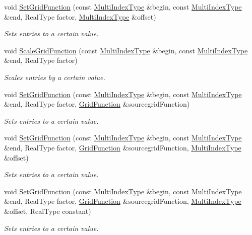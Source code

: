 \begin{DoxyCompactItemize}
void \hyperlink{classGridFunction_adc4e126ab14dd32a55243cb75b1c2083}{Set\-Grid\-Function} (const \hyperlink{classArray}{Multi\-Index\-Type} \&begin, const \hyperlink{classArray}{Multi\-Index\-Type} \&end, Real\-Type factor, \hyperlink{classArray}{Multi\-Index\-Type} \&offset)
\begin{DoxyCompactList}\small\item\em Sets entries to a certain value. \end{DoxyCompactList}\item 
void \hyperlink{classGridFunction_a8970655a48c5af01d053593bdd475068}{Scale\-Grid\-Function} (const \hyperlink{classArray}{Multi\-Index\-Type} \&begin, const \hyperlink{classArray}{Multi\-Index\-Type} \&end, Real\-Type factor)
\begin{DoxyCompactList}\small\item\em Scales entries by a certain value. \end{DoxyCompactList}\item 
void \hyperlink{classGridFunction_a7d8edd7866f90b7c2f2c4ec0de9e4c3f}{Set\-Grid\-Function} (const \hyperlink{classArray}{Multi\-Index\-Type} \&begin, const \hyperlink{classArray}{Multi\-Index\-Type} \&end, Real\-Type factor, \hyperlink{classGridFunction}{Grid\-Function} \&sourcegrid\-Function)
\begin{DoxyCompactList}\small\item\em Sets entries to a certain value. \end{DoxyCompactList}\item 
void \hyperlink{classGridFunction_a6569012ef6320b82d010459993dbdb19}{Set\-Grid\-Function} (const \hyperlink{classArray}{Multi\-Index\-Type} \&begin, const \hyperlink{classArray}{Multi\-Index\-Type} \&end, Real\-Type factor, \hyperlink{classGridFunction}{Grid\-Function} \&sourcegrid\-Function, \hyperlink{classArray}{Multi\-Index\-Type} \&offset)
\begin{DoxyCompactList}\small\item\em Sets entries to a certain value. \end{DoxyCompactList}\item 
void \hyperlink{classGridFunction_a0890154fd279cf93ae794924c8684d58}{Set\-Grid\-Function} (const \hyperlink{classArray}{Multi\-Index\-Type} \&begin, const \hyperlink{classArray}{Multi\-Index\-Type} \&end, Real\-Type factor, \hyperlink{classGridFunction}{Grid\-Function} \&sourcegrid\-Function, \hyperlink{classArray}{Multi\-Index\-Type} \&offset, Real\-Type constant)
\begin{DoxyCompactList}\small\item\em Sets entries to a certain value. \end{DoxyCompactList}\item 

\end{DoxyCompactItemize}
